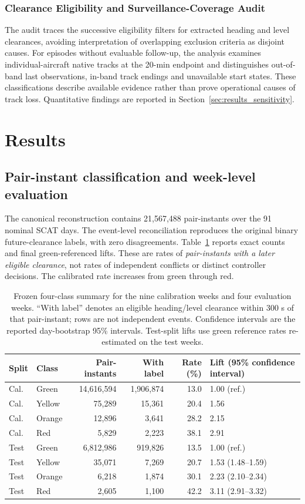 \documentclass[aerospace,article,submit,moreauthors]{Definitions/mdpi}
\begin{document}
\subsubsection{Clearance Eligibility and Surveillance-Coverage Audit}
The audit traces the successive eligibility filters for extracted heading and level clearances, avoiding interpretation of overlapping exclusion criteria as disjoint causes. For episodes without evaluable follow-up, the analysis examines individual-aircraft native tracks at the 20-min endpoint and distinguishes out-of-band last observations, in-band track endings and unavailable start states. These classifications describe available evidence rather than prove operational causes of track loss. Quantitative findings are reported in Section~\ref{sec:results_sensitivity}.

\section{Results}\label{sec:results}
\subsection{Pair-instant classification and week-level evaluation}
The canonical reconstruction contains 21,567,488 pair-instants over the 91 nominal SCAT days. The event-level reconciliation reproduces the original binary future-clearance labels, with zero disagreements. Table~\ref{tab:pair} reports exact counts and final green-referenced lifts. These are rates of \emph{pair-instants with a later eligible clearance}, not rates of independent conflicts or distinct controller decisions. The calibrated rate increases from green through red.

\begin{table}[t]
\caption{Frozen four-class summary for the nine calibration weeks and four evaluation weeks. ``With label'' denotes an eligible heading/level clearance within 300 s of that pair-instant; rows are not independent events. Confidence intervals are the reported day-bootstrap 95\% intervals. Test-split lifts use green reference rates re-estimated on the test weeks.}\label{tab:pair}
\begin{tabular}{@{}llrrrl@{}}
\toprule
Split & Class & Pair-instants & With label & Rate (\%) & Lift (95\% confidence interval)\\
\midrule
Cal. & Green & 14,616,594 & 1,906,874 & 13.0 & 1.00 (ref.)\\
Cal. & Yellow & 75,289 & 15,361 & 20.4 & 1.56\\
Cal. & Orange & 12,896 & 3,641 & 28.2 & 2.15\\
Cal. & Red & 5,829 & 2,223 & 38.1 & 2.91\\
Test & Green & 6,812,986 & 919,826 & 13.5 & 1.00 (ref.)\\
Test & Yellow & 35,071 & 7,269 & 20.7 & 1.53 (1.48--1.59)\\
Test & Orange & 6,218 & 1,874 & 30.1 & 2.23 (2.10--2.34)\\
Test & Red & 2,605 & 1,100 & 42.2 & 3.11 (2.91--3.32)\\
\bottomrule
\end{tabular}
\end{table}
\end{document}
